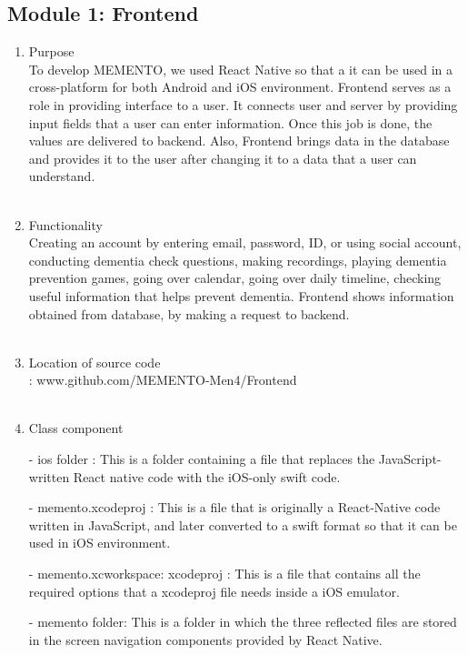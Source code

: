 \documentclass[conference]{IEEEtran}
\begin{document}
\subsection{Module 1: Frontend}
\begin{enumerate}
    \item Purpose\\
    To develop MEMENTO, we used React Native so that a it can be used in a cross-platform for both Android and iOS environment. Frontend serves as a role in providing interface to a user. It connects user and server by providing input fields that a user can enter information. Once this job is done, the values are delivered to backend. Also, Frontend brings data in the database and provides it to the user after changing it to a data that a user can understand.\\ \\
    \item Functionality\\
    Creating an account by entering email, password, ID, or using social account, conducting dementia check questions, making recordings, playing dementia prevention games, going over calendar, going over daily timeline, checking useful information that helps prevent dementia. Frontend shows information obtained from database, by making a request to backend.\\ \\
    \item Location of source code\\: www.github.com/MEMENTO-Men4/Frontend \\ \\
    \item Class component\\
        \item[-] ios folder : This is a folder containing a file that replaces the JavaScript-written React native code with the iOS-only swift code.\\
        \item[-] memento.xcodeproj : This is a file that is originally a React-Native code written in JavaScript, and later converted to a swift format so that it can be used in iOS environment. \\
        \item[-] memento.xcworkspace: xcodeproj : This is a file that contains all the required options that a xcodeproj file needs inside a iOS emulator.\\ 
        \item[-] memento folder: This is a folder in which the three reflected files are stored in the screen navigation components provided by React Native.\\

\end{enumerate}
\end{document}
